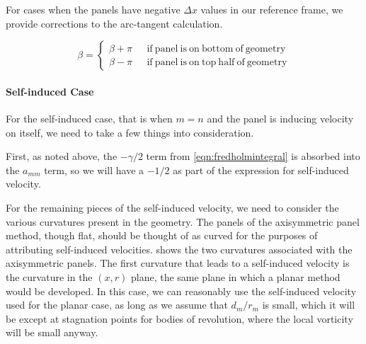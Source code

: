 %


\noindent For cases when the panels have negative \(\Delta x\) values in our reference frame, we provide corrections to the arc-tangent calculation.

\begin{equation}
	\beta =
	\begin{cases}
		\beta + \pi ~~~&\mathrm{if~panel~is~on~bottom~of~geometry}\\
		\beta - \pi ~~~&\mathrm{if~panel~is~on~top~half~of~geometry}
	\end{cases}
\end{equation}

\paragraph{Self-induced Case}
For the self-induced case, that is when \(m=n\) and the panel is inducing velocity on itself, we need to take a few things into consideration.

First, as noted above, the \(-\gamma/2\) term from \cref{eqn:fredholmintegral} is absorbed into the \(a_{mm}\) term, so we will have a \(-1/2\) as part of the expression for self-induced velocity.

For the remaining pieces of the self-induced velocity, we need to consider the various curvatures present in the geometry.
The panels of the axisymmetric panel method, though flat, should be thought of as curved for the purposes of attributing self-induced velocities.
 shows the two curvatures associated with the axisymmetric panels.
The first curvature that leads to a self-induced velocity is the curvature in the \((x,r)\) plane, the same plane in which a planar method would be developed.
In this case, we can reasonably use the self-induced velocity used for the planar case, as long as we assume that \(d_m/r_m\) is small, which it will be except at stagnation points for bodies of revolution, where the local vorticity will be small anyway.

